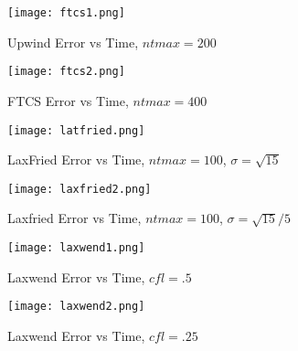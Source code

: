 \documentclass[11pt,letterpaper]{article}
\begin{document}
\begin{figure}[bth]
\centering
\texttt{[image: ftcs1.png]}
\caption{Upwind Error vs Time, $ntmax=200$}
\texttt{[image: ftcs2.png]}
\caption{FTCS Error vs Time, $ntmax=400$}
\label{fig:2}
\end{figure}


\begin{figure}[bth]
\centering
\texttt{[image: latfried.png]}
\caption{LaxFried Error vs Time, $ntmax=100$, $\sigma=\sqrt{15}$}
\texttt{[image: laxfried2.png]}
\caption{Laxfried Error vs Time, $ntmax=100$, $\sigma=\sqrt{15}/5$}
\label{fig:3}
\end{figure}

\begin{figure}[bth]
\centering
\texttt{[image: laxwend1.png]}
\caption{Laxwend Error vs Time, $cfl=.5$}
\texttt{[image: laxwend2.png]}
\caption{Laxwend Error vs Time, $cfl=.25$}
\label{fig:4}
\end{figure}
\end{document}
